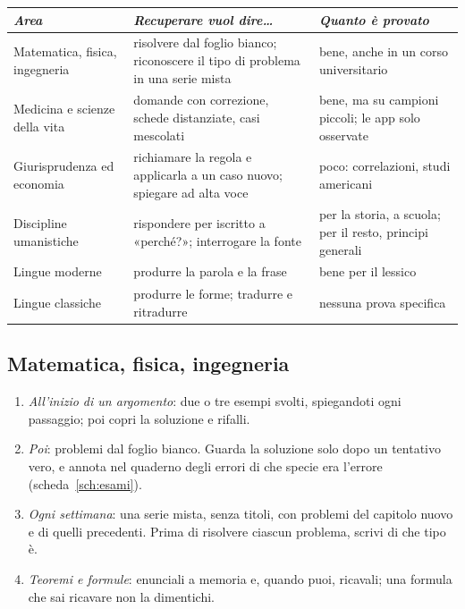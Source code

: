 \begin{center}\small
  \begin{tabular}{@{}>{\raggedright\arraybackslash}p{}>{\raggedright\arraybackslash}p{}>{\raggedright\arraybackslash}p{}@{}}
    \toprule
    \textit{Area} & \textit{Recuperare vuol dire\dots} & \textit{Quanto è provato} \\
    \midrule
    Matematica, fisica, ingegneria & risolvere dal foglio bianco;
      riconoscere il tipo di problema in una serie mista & bene, anche
      in un corso universitario \\
    \addlinespace
    Medicina e scienze della vita & domande con correzione, schede
      distanziate, casi mescolati & bene, ma su campioni piccoli; le
      app solo osservate \\
    \addlinespace
    Giurisprudenza ed economia & richiamare la regola e applicarla a un
      caso nuovo; spiegare ad alta voce & poco: correlazioni, studi
      americani \\
    \addlinespace
    Discipline umanistiche & rispondere per iscritto a «perché?»;
      interrogare la fonte & per la storia, a scuola; per il resto,
      principi generali \\
    \addlinespace
    Lingue moderne & produrre la parola e la frase & bene per il
      lessico \\
    \addlinespace
    Lingue classiche & produrre le forme; tradurre e ritradurre &
      nessuna prova specifica \\
    \bottomrule
  \end{tabular}
\end{center}

\subsection*{Matematica, fisica, ingegneria}

\begin{enumerate}[leftmargin=1.4em, itemsep=0pt, topsep=0.2\baselineskip]
  \item \emph{All'inizio di un argomento}: due o tre esempi svolti,
        spiegandoti ogni passaggio; poi copri la soluzione e rifalli.
  \item \emph{Poi}: problemi dal foglio bianco. Guarda la soluzione solo
        dopo un tentativo vero, e annota nel quaderno degli errori di
        che specie era l'errore (scheda~\ref{sch:esami}).
  \item \emph{Ogni settimana}: una serie mista, senza titoli, con
        problemi del capitolo nuovo e di quelli precedenti. Prima di
        risolvere ciascun problema, scrivi di che tipo è.
  \item \emph{Teoremi e formule}: enunciali a memoria e, quando puoi,
        ricavali; una formula che sai ricavare non la dimentichi.
\end{enumerate}


